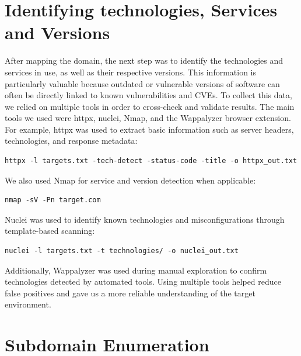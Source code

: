 \documentclass[12pt,a4paper]{report}
\begin{document}
\section{Identifying technologies, Services and Versions}

After mapping the domain, the next step was to identify the technologies and services in use, as well as their respective versions. This information is particularly valuable because outdated or vulnerable versions of software can often be directly linked to known vulnerabilities and CVEs.
To collect this data, we relied on multiple tools in order to cross-check and validate results. The main tools we used were httpx, nuclei, Nmap, and the Wappalyzer browser extension.
For example, httpx was used to extract basic information such as server headers, technologies, and response metadata:

\begin{lstlisting}[style=bash]
httpx -l targets.txt -tech-detect -status-code -title -o httpx_out.txt
\end{lstlisting}

We also used Nmap for service and version detection when applicable:

\begin{lstlisting}[style=bash]
nmap -sV -Pn target.com
\end{lstlisting}

Nuclei was used to identify known technologies and misconfigurations through template-based scanning:

\begin{lstlisting}[style=bash]
nuclei -l targets.txt -t technologies/ -o nuclei_out.txt
\end{lstlisting}

Additionally, Wappalyzer was used during manual exploration to confirm technologies detected by automated tools. Using multiple tools helped reduce false positives and gave us a more reliable understanding of the target environment.

\section{Subdomain Enumeration}
\end{document}
